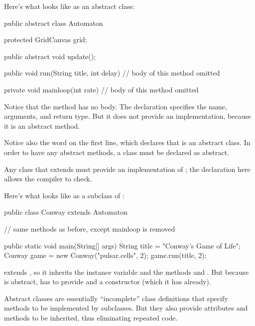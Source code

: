 Here's what  looks like as an abstract class:

\begin{code}
public abstract class Automaton {
    protected GridCanvas grid;

    public abstract void update();

    public void run(String title, int delay) {
        // body of this method omitted
    }

    private void mainloop(int rate) {
        // body of this method omitted
    }
}
\end{code}

Notice that the  method has no body.
The declaration specifies the name, arguments, and return type.
But it does not provide an implementation, because it is an abstract method.

Notice also the word  on the first line, which declares that  is an abstract class.
In order to have any abstract methods, a class must be declared as abstract.

Any class that extends  must provide an implementation of ; the declaration here allows the compiler to check.

Here's what  looks like as a subclass of :

\begin{code}
public class Conway extends Automaton {

    // same methods as before, except mainloop is removed

    public static void main(String[] args) {
        String title = "Conway's Game of Life";
        Conway game = new Conway("pulsar.cells", 2);
        game.run(title, 2);
    }
}
\end{code}

 extends , so it inherits the  instance variable  and the methods  and .
But because  is abstract,  has to provide  and a constructor (which it has already).

Abstract classes are essentially ``incomplete'' class definitions that specify methods to be implemented by subclasses.
But they also provide attributes and methods to be inherited, thus eliminating repeated code.



